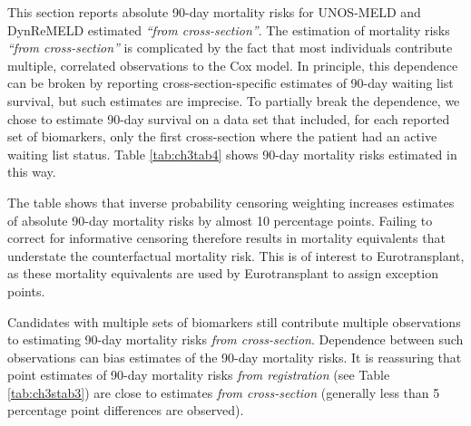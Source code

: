 \documentclass[11pt,twoside,]{book}
\begin{document}
This section reports absolute 90-day mortality risks for UNOS-MELD and
DynReMELD estimated \emph{``from cross-section''}. The estimation of mortality
risks \emph{``from cross-section''} is complicated by the fact that most
individuals contribute multiple, correlated observations to the Cox
model. In principle, this dependence can be broken by reporting cross-section-specific estimates of 90-day waiting list survival, but such estimates are
imprecise. To partially break the dependence, we chose to estimate
90-day survival on a data set that included, for each reported set of
biomarkers, only the first cross-section where the patient had an active
waiting list status. Table \ref{tab:ch3tab4} shows 90-day
mortality risks estimated in this way.

The table shows that inverse probability censoring weighting increases
estimates of absolute 90-day mortality risks by almost 10 percentage
points. Failing to correct for informative censoring therefore results in
mortality equivalents that understate the counterfactual mortality
risk. This is of interest to Eurotransplant, as these mortality equivalents
are used by Eurotransplant to assign exception points.

Candidates with multiple sets of biomarkers still contribute multiple observations
to estimating 90-day mortality risks \emph{from cross-section}. Dependence between
such observations can bias estimates of the 90-day mortality risks. It is reassuring
that point estimates of 90-day mortality risks \emph{from registration}
(see Table \ref{tab:ch3stab3}) are close to estimates \emph{from
cross-section} (generally less than 5 percentage point differences are
observed).
\end{document}
